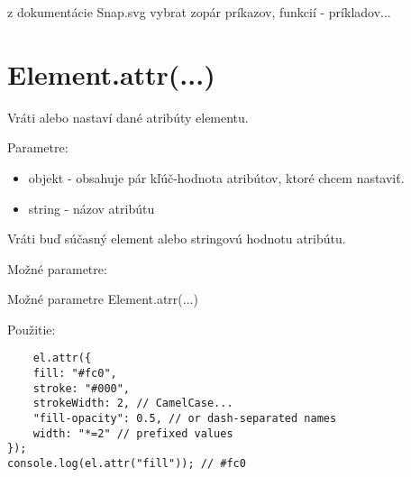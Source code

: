 
z dokumentácie Snap.svg vybrat zopár príkazov, funkcií - príkladov...


\section{Element.attr(...)}
Vráti alebo nastaví dané atribúty elementu.

Parametre:
\begin{itemize}
	\item objekt - obsahuje pár kľúč-hodnota atribútov, ktoré chcem nastaviť.
	\item string - názov atribútu
\end{itemize}
Vráti buď súčasný element alebo stringovú hodnotu atribútu.

Možné parametre:

\begin{table}
	
	
	
		\caption{Možné parametre Element.atrr(...)}
		\label{parametre:attr}
\end{table}



Použitie:
\begin{lstlisting}
	el.attr({
	fill: "#fc0",
	stroke: "#000",
	strokeWidth: 2, // CamelCase...
	"fill-opacity": 0.5, // or dash-separated names
	width: "*=2" // prefixed values
});
console.log(el.attr("fill")); // #fc0
\end{lstlisting}
